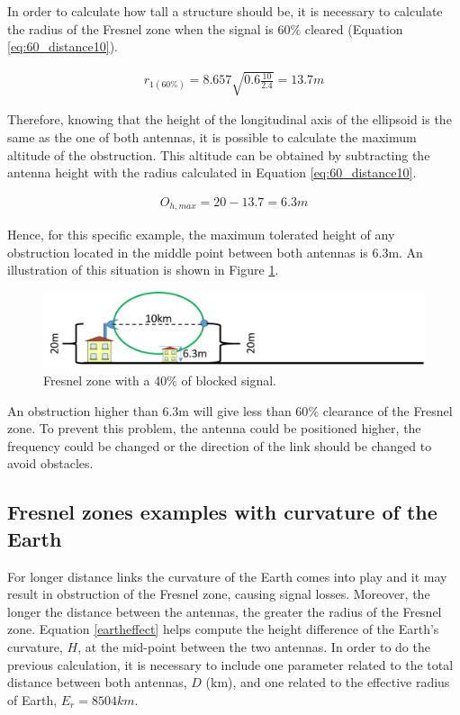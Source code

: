 In order to calculate how tall a structure should be, it is necessary to calculate the radius of the Fresnel zone when the signal is 60$\%$ cleared (Equation \ref{eq:60_distance10}).

\begin{align}
r_{1(60\%)} = 8.657\sqrt{0.6 \frac{10}{2.4}} = 13.7m\label{eq:60_distance10}
\end{align}
  
Therefore, knowing that the height of the longitudinal axis of the ellipsoid is the same as the one of both antennas, it is possible to calculate the maximum altitude of the obstruction. This altitude can be obtained by subtracting the antenna height with the radius calculated in Equation \ref{eq:60_distance10}.

\begin{align}
\text{$O_{h,max}$} = 20 - 13.7 = 6.3m\label{eq:height_obstruction}
\end{align}

Hence, for this specific example, the maximum tolerated height of any obstruction located in the middle point between both antennas is 6.3m. An illustration of this situation is shown in Figure \ref{fig:fresnel_zones_10km_60procent}.

\begin{figure}[H]
	\centering
	\includegraphics[scale=0.50]{figures/fresnel_10km_60procent.png}
	\caption{Fresnel zone with a 40$\%$ of blocked signal.}
	\label{fig:fresnel_zones_10km_60procent}
\end{figure}  

An obstruction higher than 6.3m will give less than 60$\%$ clearance of the Fresnel zone. To prevent this problem, the antenna could be positioned higher, the frequency could be changed or the direction of the link should be changed to avoid obstacles.

\subsection{Fresnel zones examples with curvature of the Earth}
For longer distance links the curvature of the Earth comes into play and it may result in obstruction of the Fresnel zone, causing signal losses. Moreover, the longer the distance between the antennas, the greater the radius of the Fresnel zone. Equation \ref{eartheffect} helps compute the height difference of the Earth's curvature, $H$, at the mid-point between the two antennas. In order to do the previous calculation, it is necessary to include one parameter related to the total distance between both antennas, $D$ (km), and one related to the effective radius of Earth, $E_r = 8 504 km$.

